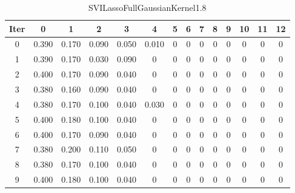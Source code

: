 \begin{table}
	\begin{center}
		\begin{tabular}{|c|c|c|c|c|c|c|c|c|c|c|c|c|c|}
			\hline
			Iter & 0 & 1 & 2 & 3 & 4 & 5 & 6 & 7 & 8 & 9 & 10 & 11 & 12 \\
			\hline
			0 & 0.390 & 0.170 & 0.090 & 0.050 & 0.010 & 0 & 0 & 0 & 0 & 0 & 0 & 0 & 0 \\
			\hline
			1 & 0.390 & 0.170 & 0.030 & 0.090 & 0 & 0 & 0 & 0 & 0 & 0 & 0 & 0 & 0 \\
			\hline
			2 & 0.400 & 0.170 & 0.090 & 0.040 & 0 & 0 & 0 & 0 & 0 & 0 & 0 & 0 & 0 \\
			\hline
			3 & 0.380 & 0.160 & 0.090 & 0.040 & 0 & 0 & 0 & 0 & 0 & 0 & 0 & 0 & 0 \\
			\hline
			4 & 0.380 & 0.170 & 0.100 & 0.040 & 0.030 & 0 & 0 & 0 & 0 & 0 & 0 & 0 & 0 \\
			\hline
			5 & 0.400 & 0.180 & 0.100 & 0.040 & 0 & 0 & 0 & 0 & 0 & 0 & 0 & 0 & 0 \\
			\hline
			6 & 0.400 & 0.170 & 0.090 & 0.040 & 0 & 0 & 0 & 0 & 0 & 0 & 0 & 0 & 0 \\
			\hline
			7 & 0.380 & 0.200 & 0.110 & 0.050 & 0 & 0 & 0 & 0 & 0 & 0 & 0 & 0 & 0 \\
			\hline
			8 & 0.380 & 0.170 & 0.100 & 0.040 & 0 & 0 & 0 & 0 & 0 & 0 & 0 & 0 & 0 \\
			\hline
			9 & 0.400 & 0.180 & 0.100 & 0.040 & 0 & 0 & 0 & 0 & 0 & 0 & 0 & 0 & 0 \\
			\hline
		\end{tabular}
	\end{center}
	\caption{SVILassoFullGaussianKernel1.8}
\end{table}